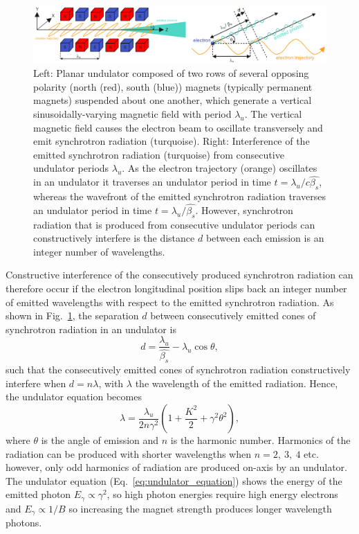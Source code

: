 \documentclass[../main.tex]{subfiles}
\begin{document}
\begin{figure}[!h]
\centering
\includegraphics[width=\textwidth]{Figures/Introduction/undulator_and_interference.pdf}
\caption{Left: Planar undulator composed of two rows of several opposing polarity (north (red), south (blue)) magnets (typically permanent magnets) suspended about one another, which generate a vertical sinusoidally-varying magnetic field with period $\lambda_{u}$. The vertical magnetic field causes the electron beam to oscillate transversely and emit synchrotron radiation (turquoise). Right: Interference of the emitted synchrotron radiation (turquoise) from consecutive undulator periods $\lambda_{u}$. As the electron trajectory (orange) oscillates in an undulator it traverses an undulator period in time $t= \lambda_{u}/c\hat{\beta_{s}}$, whereas the wavefront of the emitted synchrotron radiation traverses an undulator period in time $t=\lambda_{u}/\hat{\beta_{s}}$. However, synchrotron radiation that is produced from consecutive undulator periods can constructively interfere is the distance $d$ between each emission is an integer number of wavelengths.}
\label{fig:planar_undulator_diagram}
\end{figure}

Constructive interference of the consecutively produced synchrotron radiation can therefore occur if the electron longitudinal position slips back an integer number of emitted wavelengths with respect to the emitted synchrotron radiation. As shown in Fig.~\ref{fig:planar_undulator_diagram}, the separation $d$ between consecutively emitted cones of synchrotron radiation in an undulator is 
\begin{equation}
d = \frac{\lambda_{u}}{\hat{\beta_{s}}} - \lambda_{u}\cos\theta,
\label{eq:undulator_constructive_interference}    
\end{equation}
such that the consecutively emitted cones of synchrotron radiation constructively interfere when $d=n\lambda$, with $\lambda$ the wavelength of the emitted radiation. Hence, the undulator equation becomes
\begin{equation}
\lambda = \frac{\lambda_{u}}{2n\gamma^{2}}\left(1+\frac{K^{2}}{2}+\gamma^{2}\theta^{2}\right),
\label{eq:undulator_equation}    
\end{equation}
where $\theta$ is the angle of emission and $n$ is the harmonic number. Harmonics of the radiation can be produced with shorter wavelengths when $n = 2,~3,~4$ etc. however, only odd harmonics of radiation are produced on-axis by an undulator. The undulator equation (Eq.~\ref{eq:undulator_equation}) shows the energy of the emitted photon $E_{\gamma} \propto \gamma^{2}$, so high photon energies require high energy electrons and $E_{\gamma} \propto 1/B$ so increasing the magnet strength produces longer wavelength photons. 
\end{document}

